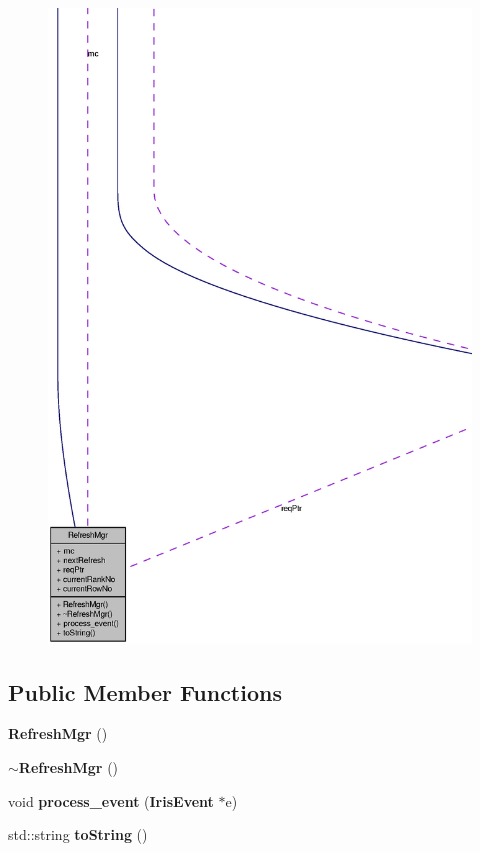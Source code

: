 \begin{figure}[H]
\begin{center}
\leavevmode
\includegraphics[width=400pt]{classRefreshMgr__coll__graph}
\end{center}
\end{figure}
\subsection*{Public Member Functions}
\begin{CompactItemize}
\item 
{\bf RefreshMgr} ()
\item 
{\bf $\sim$RefreshMgr} ()
\item 
void {\bf process\_\-event} ({\bf IrisEvent} $\ast$e)
\item 
std::string {\bf toString} ()
\end{CompactItemize}
